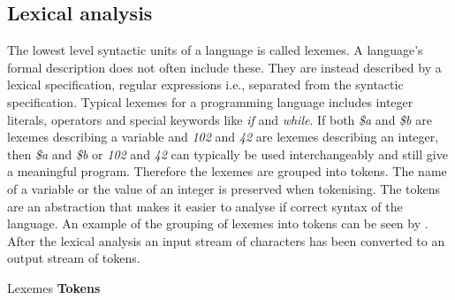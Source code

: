 \subsection{Lexical analysis}
The lowest level syntactic units of a language is called lexemes. A language's formal description does not often include these. They are instead described by a lexical specification, regular expressions i.e., separated from the syntactic specification\cite[p. 135]{sebesta2013}. Typical lexemes for a programming language includes integer literals, operators and special keywords like \textit{if} and \textit{while}. If both \textit{\$a} and \textit{\$b} are lexemes describing a variable and \textit{102} and \textit{42} are lexemes describing an integer, then \textit{\$a} and \textit{\$b} or \textit{102} and \textit{42} can typically be used interchangeably and still give a meaningful program. Therefore the lexemes are grouped into tokens. The name of a variable or the value of an integer is preserved when tokenising. The tokens are an abstraction that makes it easier to analyse if correct syntax of the language. An example of the grouping of lexemes into tokens can be seen by . After the lexical analysis an input stream of characters has been converted to an output stream of tokens.


		    {               }
{Lexemes   }{\textbf{Tokens}}{
}


